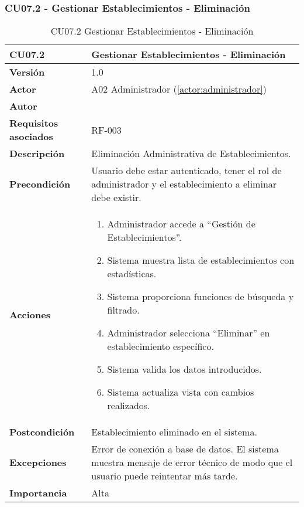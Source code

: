 \subsubsection{CU07.2 - Gestionar Establecimientos - Eliminación}

\begin{table}[H]
	\centering
	\begin{tabularx}{\linewidth}{ p{} p{} }
		\toprule
		\textbf{CU07.2}    & \textbf{Gestionar Establecimientos - Eliminación} \\
		\toprule
		\textbf{Versión}              & 1.0    \\
		\textbf{Actor}                & A02 Administrador (\ref{actor:administrador}) \\
		\textbf{Autor}                & \nombre \\
		\textbf{Requisitos asociados} & RF-003 \\
		\textbf{Descripción}          & Eliminación Administrativa de Establecimientos. \\
		\textbf{Precondición}         & Usuario debe estar autenticado, tener el rol de administrador y el establecimiento a eliminar debe existir. \\
		\textbf{Acciones}             &
		\begin{enumerate}
			\def\labelenumi{\arabic{enumi}.}
			\tightlist
			\item Administrador accede a ``Gestión de Establecimientos''.
            \item Sistema muestra lista de establecimientos con estadísticas.
            \item Sistema proporciona funciones de búsqueda y filtrado.
            \item Administrador selecciona ``Eliminar'' en establecimiento específico.
            \item Sistema valida los datos introducidos.
            \item Sistema actualiza vista con cambios realizados.
		\end{enumerate}\\
		\textbf{Postcondición}        & Establecimiento eliminado en el sistema. \\
		\textbf{Excepciones}          & Error de conexión a base de datos. El sistema muestra mensaje de error técnico de modo que el usuario puede reintentar más tarde.\\
		\textbf{Importancia}          & Alta \\
		\bottomrule
	\end{tabularx}
	\caption{CU07.2 Gestionar Establecimientos - Eliminación}
	\label{cu:gestionar-establecimientos-eliminacion}
\end{table}

